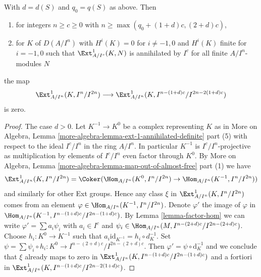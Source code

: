 \begin{lemma}
\label{lemma-bound-two-term-complex}
With $d = d(S)$ and $q_0 = q(S)$ as above. Then
\begin{enumerate}
\item for integers $n \geq c \geq 0$ with
$n \geq \max(q_0 + (1 + d)c, (2 + d)c)$,
\item for $K$ of $D(A/I^n)$ with $H^i(K) = 0$ for $i \not = -1, 0$
and $H^i(K)$ finite for $i = -1, 0$ such that $\Ext^1_{A/I^c}(K, N)$
is annihilated by $I^c$ for all finite $A/I^n$-modules $N$
\end{enumerate}
the map
$$
\Ext^1_{A/I^n}(K, I^n/I^{2n})
\longrightarrow
\Ext^1_{A/I^n}(K, I^{n - (1 + d)c}/I^{2n - 2(1 + d)c})
$$
is zero.
\end{lemma}

\begin{proof}
The case $d > 0$. Let $K^{-1} \to K^0$ be a complex representing $K$ as in
More on Algebra, Lemma \ref{more-algebra-lemma-ext-1-annihilated-definite}
part (5) with respect to the ideal $I^c/I^n$ in the ring $A/I^n$.
In particular $K^{-1}$ is $I^c/I^n$-projective as multiplication
by elements of $I^c/I^n$ even factor through $K^0$. By
More on Algebra, Lemma \ref{more-algebra-lemma-map-out-of-almost-free} part (1)
we have
$$
\Ext^1_{A/I^n}(K, I^n/I^{2n}) =
\Coker(\Hom_{A/I^n}(K^0, I^n/I^{2n}) \to \Hom_{A/I^n}(K^{-1}, I^n/I^{2n}))
$$
and similarly for other Ext groups. Hence any class $\xi$ in
$\Ext^1_{A/I^n}(K, I^n/I^{2n})$
comes from an element $\varphi \in \Hom_{A/I^n}(K^{-1}, I^n/I^{2n})$.
Denote $\varphi'$ the image of $\varphi$ in
$\Hom_{A/I^n}(K^{-1}, I^{n - (1 + d)c}/I^{2n - (1 + d)c})$.
By Lemma \ref{lemma-factor-hom}
we can write $\varphi' = \sum a_i \psi_i$ with $a_i \in I^c$ and
$\psi_i \in \Hom_{A/I^n}(M, I^{n - (2 + d)c}/I^{2n - (2 + d)c})$.
Choose $h_i : K^0 \to K^{-1}$ such that
$a_i \text{id}_{K^{-1}} = h_i \circ d_K^{-1}$. Set
$\psi = \sum \psi_i \circ h_i : K^0 \to I^{n - (2 + d)c}/I^{2n - (2 + d)c}$.
Then $\varphi' = \psi \circ \text{d}_K^{-1}$ and we conclude that
$\xi$ already maps to zero in
$\Ext^1_{A/I^n}(K, I^{n - (1 + d)c}/I^{2n - (1 + d)c})$
and a fortiori in
$\Ext^1_{A/I^n}(K, I^{n - (1 + d)c}/I^{2n - 2(1 + d)c})$.


\end{proof}
